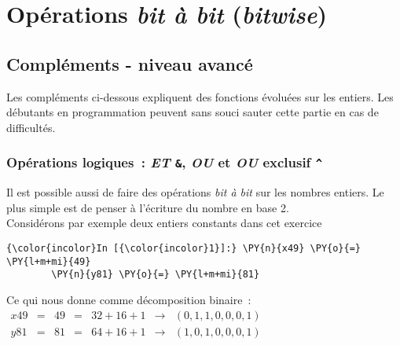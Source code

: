     \hypertarget{opuxe9rations-bit-uxe0-bit-bitwise}{%
\section{\texorpdfstring{Opérations \emph{bit à bit}
(\emph{bitwise})}{Opérations bit à bit (bitwise)}}\label{opuxe9rations-bit-uxe0-bit-bitwise}}

    \hypertarget{compluxe9ments---niveau-avancuxe9}{%
\subsection{Compléments - niveau
avancé}\label{compluxe9ments---niveau-avancuxe9}}

    Les compléments ci-dessous expliquent des fonctions évoluées sur les
entiers. Les débutants en programmation peuvent sans souci sauter cette
partie en cas de difficultés.

    \hypertarget{opuxe9rations-logiques-et-ou-et-ou-exclusif}{%
\subsubsection{\texorpdfstring{Opérations logiques~: \emph{ET}
\texttt{\&}, \emph{OU} \texttt{\textbar{}} et \emph{OU} exclusif
\texttt{\^{}}}{Opérations logiques~: ET \&, OU \textbar{} et OU exclusif \^{}}}\label{opuxe9rations-logiques-et-ou-et-ou-exclusif}}

    Il est possible aussi de faire des opérations \emph{bit à bit} sur les
nombres entiers. Le plus simple est de penser à l'écriture du nombre en
base 2.\\

Considérons par exemple deux entiers constants dans cet exercice

    \begin{Verbatim}[commandchars=\\\{\}]
{\color{incolor}In [{\color{incolor}1}]:} \PY{n}{x49} \PY{o}{=} \PY{l+m+mi}{49}
        \PY{n}{y81} \PY{o}{=} \PY{l+m+mi}{81}
\end{Verbatim}


    Ce qui nous donne comme décomposition binaire~:\\

\(\begin{array}{rcccccc} x49 & = & 49 & = & 32 + 16 + 1 & \rightarrow &(0,1,1,0,0,0,1) \\ y81 & = & 81 & = & 64 + 16 + 1 & \rightarrow &(1,0,1,0,0,0,1) \end{array}\)\\


